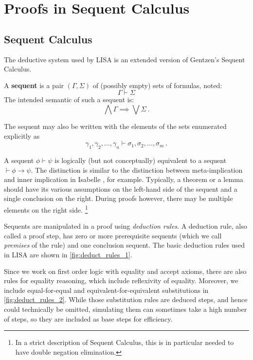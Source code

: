 \section{Proofs in Sequent Calculus}
\label{sect:proofs_lk}
\subsection{Sequent Calculus}
\label{subsec:lk}
The deductive system used by LISA is an extended version of Gentzen's Sequent Calculus.
\begin{defin}
  A \textbf{sequent} is a pair $(\Gamma, \Sigma)$ of (possibly empty) sets of formulas, noted:
  $$\Gamma \vdash \Sigma$$
  The intended semantic of such a sequent is:
  \begin{equation*}
    \label{eq:SequentSemantic}
    \bigwedge \Gamma \implies \bigvee \Sigma~.
  \end{equation*}
  
  The sequent may also be written with the elements of the sets enumerated explicitly as 
  \begin{equation*}
    \gamma_1, \gamma_2, \ldots, \gamma_n \vdash \sigma_1, \sigma_2, \ldots, \sigma_m~.
  \end{equation*}
\end{defin}
A sequent $\phi \vdash \psi$ is logically (but not conceptually) equivalent to a sequent $\vdash \phi \rightarrow \psi$. The distinction is similar to the distinction between meta-implication and inner implication in Isabelle \cite{paulson1993isabelle}, for example. Typically, a theorem or a lemma should have its various assumptions on the left-hand side of the sequent and a single conclusion on the right. During proofs however, there may be multiple elements on the right side. \footnote{In a strict description of Sequent Calculus, this is in particular needed to have double negation elimination.}

Sequents are manipulated in a proof using \emph{deduction rules}. A deduction rule, also called a proof step, has zero or more prerequisite sequents (which we call \emph{premises} of the rule) and one conclusion sequent. The basic deduction rules used in LISA are shown in \autoref{fig:deduct_rules_1}.

Since we work on first order logic with equality and accept axioms, there are also rules for equality reasoning, which include reflexivity of equality. Moreover, we include equal-for-equal and equivalent-for-equivalent substitutions in \autoref{fig:deduct_rules_2}. While those substitution rules are deduced steps, and hence could technically be omitted, simulating them can sometimes take a high number of steps, so they are included as base steps for efficiency.

